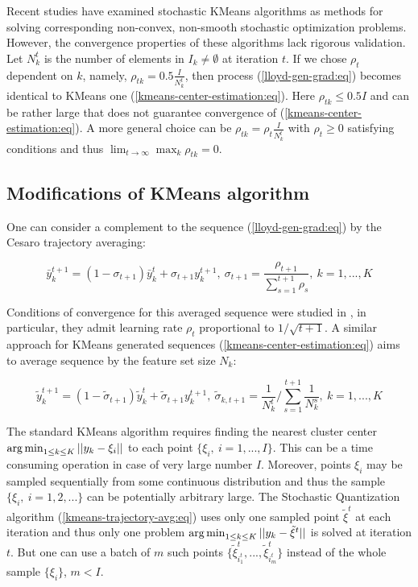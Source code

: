Recent studies \cite{Tang_2017,Zhao_Lan_Chen_Ngo_2021} have examined stochastic KMeans algorithms as methods for solving corresponding non-convex, non-smooth stochastic optimization problems. However, the convergence properties of these algorithms lack rigorous validation. Let $ N_k^t $ is the number of elements in $ I_k \neq \emptyset $ at iteration $ t $. If we chose $ \rho_t $ dependent on $ k $, namely, $ \rho_{tk} = 0.5 \frac{I}{N_k^t} $, then process (\ref{lloyd-gen-grad:eq}) becomes identical to KMeans one (\ref{kmeans-center-estimation:eq}). Here $ \rho_{tk} \leq 0.5 I $ and can be rather large that does not guarantee convergence of (\ref{kmeans-center-estimation:eq}). A more general choice can be $ \rho_{tk} = \rho_t \frac{I}{N_k^t} $ with $ \rho_t \geq 0 $ satisfying conditions  and thus $ \lim_{t \to \infty} \max_k \rho_{tk} = 0 $.

\subsection{Modifications of KMeans algorithm}

One can consider a complement to the sequence (\ref{lloyd-gen-grad:eq}) by the Cesaro trajectory averaging:

\begin{equation}
    \label{kmeans-trajectory-avg:eq}
        \bar{y}_k^{t+1} = (1 - \sigma_{t+1}) \bar{y}_k^{t} + \sigma_{t+1} y_k^{t+1}, \> \sigma_{t+1} = \frac{\rho_{t+1}}{\sum_{s=1}^{t+1} \rho_{s}}, \> k = 1, ..., K
\end{equation}

Conditions of convergence for this averaged sequence were studied in \cite{mikhalevich2024}, in particular, they admit learning rate $ \rho_t $ proportional to $ 1 / \sqrt{t+1} $. A similar approach for KMeans generated sequences (\ref{kmeans-center-estimation:eq}) aims to average sequence by the feature set size $ N_k $:

\begin{equation}
    \label{kmeans-trajectory-avg-alt:eq}
        \tilde{y}_k^{t+1} = (1 - \tilde{\sigma}_{t+1}) \tilde{y}_k^{t} + \tilde{\sigma}_{t+1} y_k^{t+1}, \> \tilde{\sigma}_{k, t+1} = \frac{1}{N_k^t} / \sum_{s=1}^{t+1} \frac{1}{N_k^s}, \> k = 1, ..., K
\end{equation}

The standard KMeans algorithm requires finding the nearest cluster center $ \operatorname*{arg\,min}_{1 \leq k \leq K} || y_k - \xi_i || $ to each point $ \{ \xi_i, \> i = 1, ..., I \} $. This can be a time consuming operation in case of very large number $ I $. Moreover, points $ \xi_i $ may be sampled sequentially from some continuous distribution and thus the sample $ \{ \xi_i, \> i = 1, 2, ... \} $ can be potentially arbitrary large. The Stochastic Quantization algorithm (\ref{kmeans-trajectory-avg:eq}) uses only one sampled point $ \tilde{\xi}^t $ at each iteration and thus only one problem $ \operatorname*{arg\,min}_{1 \leq k \leq K} || y_k - \tilde{\xi}^t || $ is solved at iteration $ t $. But one can use a batch of $ m $ such points $ \{ \tilde{\xi}^t_{i_1^t}, ..., \tilde{\xi}^t_{i_m^t} \} $ instead of the whole sample $ \{ \xi_i \} $, $ m < I $. 
